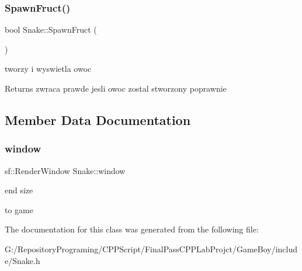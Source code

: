 \subsubsection{\texorpdfstring{SpawnFruct()}{SpawnFruct()}}
{\footnotesize\ttfamily bool Snake\+::\+Spawn\+Fruct (\begin{DoxyParamCaption}{ }\end{DoxyParamCaption})\hspace{0.3cm}{\ttfamily [private]}}



tworzy i wyswietla owoc 

\begin{DoxyReturn}{Returns}
zwraca prawde jesli owoc zostal stworzony poprawnie 
\end{DoxyReturn}


\subsection{Member Data Documentation}
\mbox{\label{class_snake_ab0352383bcd926822a8567a78d51ad13}} 
\subsubsection{\texorpdfstring{window}{window}}
{\footnotesize\ttfamily sf\+::\+Render\+Window Snake\+::window\hspace{0.3cm}{\ttfamily [private]}}



end size 

to game 

The documentation for this class was generated from the following file\+:\begin{DoxyCompactItemize}
\item 
G\+:/\+Repository\+Programing/\+C\+P\+P\+Script/\+Final\+Pass\+C\+P\+P\+Lab\+Projct/\+Game\+Boy/include/Snake.\+h\end{DoxyCompactItemize}
